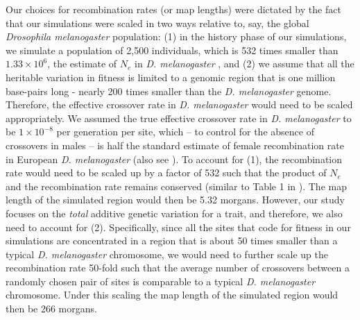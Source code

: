 \documentclass[12pt]{article}
\begin{document}
\begin{bibunit}
Our choices for recombination rates (or map lengths) were dictated by the fact that our simulations were scaled in two ways relative to, say, the global \emph{Drosophila melanogaster} population: (1) in the history phase of our simulations,  we simulate a population of 2,500 individuals, which is 532 times smaller than $1.33 \times 10^6$, the estimate of $N_e$ in \emph{D. melanogaster} \citep{campos2013codon, campos2019effects}, and (2) we assume that all the heritable variation in fitness is limited to a genomic region that is one million base-pairs long - nearly 200 times smaller than the \emph{D. melanogaster} genome. Therefore, the effective crossover rate in \emph{D. melanogaster} would need to be scaled appropriately. We assumed the true effective crossover rate in \emph{D. melanogaster} to be $1 \times 10^{-8}$ per generation per site, which -- to control for the absence of crossovers in males -- is half the standard estimate of female recombination rate in European \emph{D. melanogaster} \citep{wang2023variation} (also see \citet{comeron2012many}). To account for (1), the recombination rate would need to be scaled up by a factor of 532 such that the product of $N_e$ and the recombination rate remains conserved (similar to Table 1 in \citet{campos2019effects}). The map length of the simulated region would then be 5.32 morgans. However, our study focuses on the \textit{total} additive genetic variation for a trait, and therefore, we also need to account for (2). Specifically, since all the sites that code for fitness in our simulations are concentrated in a region that is about 50 times smaller than a typical \emph{D. melanogaster} chromosome, we would need to further scale up the recombination rate 50-fold such that the average number of crossovers between a randomly chosen pair of sites is comparable to a typical \emph{D. melanogaster} chromosome. Under this scaling the map length of the simulated region would then be 266 morgans.


\end{bibunit}
\end{document}
